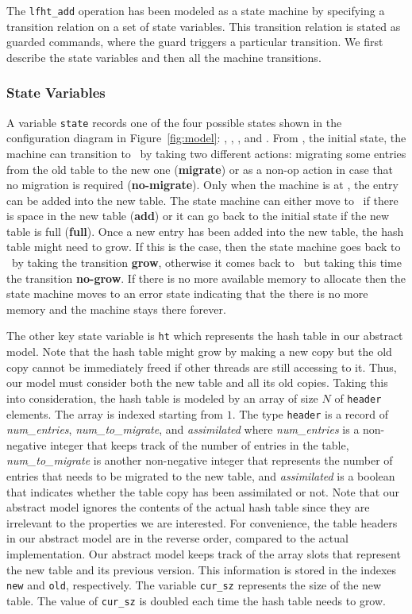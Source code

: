 The \texttt{lfht\_add} operation has been modeled as a state machine
by specifying a transition relation on a set of state variables. This
transition relation is stated as guarded commands, where the guard
triggers a particular transition.  We first describe the state
variables and then all the machine transitions.

\subsubsection{State Variables}

A variable \texttt{state} records one of the four possible states
shown in the configuration diagram in Figure~\ref{fig:model}:
\emph{\pczero}, \emph{\pcone}, \emph{\pctwo}, and \emph{\pcthree}.
%
From \pczero, the initial state, the machine can transition to
\pcone\ by taking two different actions: migrating some entries from
the old table to the new one (\textbf{migrate}) or as a non-op action
in case that no migration is required (\textbf{no-migrate}). Only when
the machine is at \pcone, the entry can be added into the new
table. The state machine can either move to \pctwo\ if there is space
in the new table (\textbf{add}) or it can go back to the initial state
if the new table is full (\textbf{full}). Once a new entry has been
added into the new table, the hash table might need to grow. If this
is the case, then the state machine goes back to \pczero\ by taking
the transition \textbf{grow}, otherwise it comes back to \pczero\ but
taking this time the transition \textbf{no-grow}. If there is no more
available memory to allocate then the state machine moves to an error
state indicating that the there is no more memory and the machine
stays there forever.

The other key state variable is \texttt{ht} which represents the hash
table in our abstract model.  Note that the hash table might grow by
making a new copy but the old copy cannot be immediately freed if
other threads are still accessing to it. Thus, our model must consider
both the new table and all its old copies. Taking this into
consideration, the hash table is modeled by an array of size $N$ of
\texttt{header} elements. The array is indexed starting from $1$. The
type \texttt{header} is a record of \emph{num\_entries},
\emph{num\_to\_migrate}, and \emph{assimilated} where
\emph{num\_entries} is a non-negative integer that keeps track of the
number of entries in the table, \emph{num\_to\_migrate} is another
non-negative integer that represents the number of entries that needs
to be migrated to the new table, and \emph{assimilated} is a boolean
that indicates whether the table copy has been assimilated or
not. Note that our abstract model ignores the contents of the actual
hash table since they are irrelevant to the properties we are
interested. For convenience, the table headers in our abstract model
are in the reverse order, compared to the actual implementation.  Our
abstract model keeps track of the array slots that represent the new
table and its previous version. This information is stored in the
indexes \texttt{new} and \texttt{old}, respectively. The variable
\texttt{cur\_sz} represents the size of the new table. The value of
\texttt{cur\_sz} is doubled each time the hash table needs to grow.

